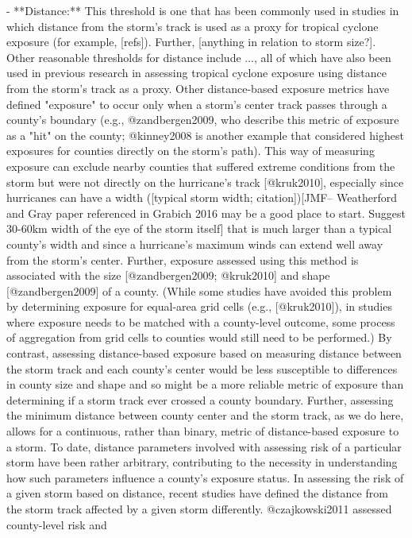 - **Distance:** This threshold is one that has been commonly used in studies in
which distance from the storm's track is used as a proxy for tropical cyclone
exposure (for example, [refs]). Further, [anything in relation to storm size?].
Other reasonable thresholds for distance include ..., all of which have also
been used in previous research in assessing tropical cyclone exposure using
distance from the storm's track as a proxy. Other distance-based exposure
metrics have defined "exposure" to occur only when a storm's center track passes
through a county's boundary (e.g., @zandbergen2009, who describe this metric of
exposure as a "hit" on the county; @kinney2008 is another example that
considered highest exposures for counties directly on the storm's path). This
way of measuring exposure can exclude nearby counties that suffered extreme
conditions from the storm but were not directly on the hurricane's track
[@kruk2010], especially since hurricanes can have a width ([typical storm width;
citation])[JMF-- Weatherford and Gray paper referenced in Grabich 2016 may be a
good place to start. Suggest 30-60km width of the eye of the storm itself] that
is much larger than a typical county's width and since a hurricane's maximum
winds can extend well away from the storm's center. Further, exposure assessed
using this method is associated with the size [@zandbergen2009; @kruk2010] and
shape [@zandbergen2009] of a county. (While some studies have avoided this
problem by determining exposure for equal-area grid cells (e.g., [@kruk2010]),
in studies where exposure needs to be matched with a county-level outcome, some
process of aggregation from grid cells to counties would still need to be
performed.) By contrast, assessing distance-based exposure based on measuring
distance between the storm track and each county's center would be less
susceptible to differences in county size and shape and so might be a more
reliable metric of exposure than determining if a storm track ever crossed a
county boundary. Further, assessing the minimum distance between county center
and the storm track, as we do here, allows for a continuous, rather than binary,
metric of distance-based exposure to a storm. To date, distance parameters
involved with assessing risk of a particular storm have been rather arbitrary,
contributing to the necessity in understanding how such parameters influence a
county's exposure status. In assessing the risk of a given storm based on
distance, recent studies have defined the distance from the storm track affected
by a given storm differently. @czajkowski2011 assessed county-level risk and
